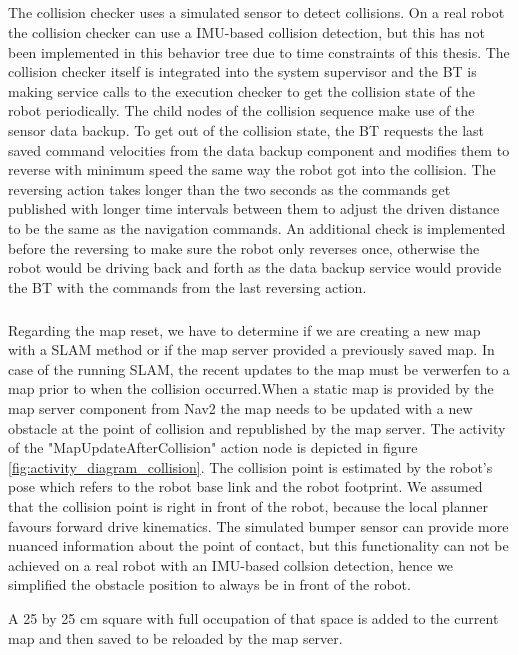 \subparagraph*{}
The collision checker uses a simulated sensor to detect collisions. On a real robot the collision checker can use a IMU-based collision detection, but this has not been implemented in this behavior tree due to time constraints of this thesis. The collision checker itself is integrated into the system supervisor and the BT is making service calls to the execution checker to get the collision state of the robot periodically. 
The child nodes of the collision sequence make use of the sensor data backup. 
To get out of the collision state, the BT requests the last saved command velocities from the data backup component and modifies them to reverse with minimum speed the same way the robot got into the collision. The reversing action takes longer than the two seconds as the commands get published with longer time intervals between them to adjust the driven distance to be the same as the navigation commands. An additional check is implemented before the reversing to make sure the robot only reverses once, otherwise the robot would be driving back and forth as the data backup service would provide the BT with the commands from the last reversing action. 

%
\subparagraph*{}
Regarding the map reset, we have to determine if we are creating a new map with a SLAM method or if the map server provided a previously saved map. In case of the running SLAM, the recent updates to the map must be verwerfen to a map prior to when the collision occurred.When a static map is provided by the map server component from Nav2 the map needs to be updated with a new obstacle at the point of collision and republished by the map server. 
The activity of the "MapUpdateAfterCollision" action node is depicted in figure \ref{fig:activity_diagram_collision}. The collision point is estimated by the robot's pose which refers to the robot base link and the robot footprint. We assumed that the collision point is right in front of the robot, because the local planner favours forward drive kinematics. The simulated bumper sensor can provide more nuanced information about the point of contact, but this functionality can not be achieved on a real robot with an IMU-based collsion detection, hence we simplified the obstacle position to always be in front of the robot. 
%

A 25 by 25 cm square with full occupation of that space is added to the current map and then saved to be reloaded by the map server. 

